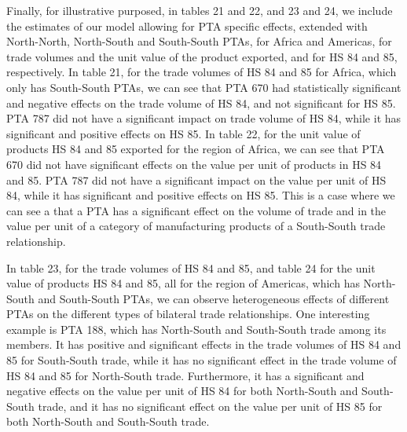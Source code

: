 Finally, for illustrative purposed, in tables 21 and 22, and 23 and 24,
we include the estimates of our model allowing for PTA specific effects,
extended with North-North, North-South and South-South PTAs, for Africa
and Americas, for trade volumes and the unit value of the product
exported, and for HS 84 and 85, respectively. In table 21, for the trade
volumes of HS 84 and 85 for Africa, which only has South-South PTAs, we
can see that PTA 670 had statistically significant and negative effects
on the trade volume of HS 84, and not significant for HS 85. PTA 787 did
not have a significant impact on trade volume of HS 84, while it has
significant and positive effects on HS 85. In table 22, for the unit
value of products HS 84 and 85 exported for the region of Africa, we can
see that PTA 670 did not have significant effects on the value per unit
of products in HS 84 and 85. PTA 787 did not have a significant impact
on the value per unit of HS 84, while it has significant and positive
effects on HS 85. This is a case where we can see a that a PTA has a
significant effect on the volume of trade and in the value per unit of a
category of manufacturing products of a South-South trade relationship.

In table 23, for the trade volumes of HS 84 and 85, and table 24 for the
unit value of products HS 84 and 85, all for the region of Americas,
which has North-South and South-South PTAs, we can observe heterogeneous
effects of different PTAs on the different types of bilateral trade
relationships. One interesting example is PTA 188, which has North-South
and South-South trade among its members. It has positive and significant
effects in the trade volumes of HS 84 and 85 for South-South trade,
while it has no significant effect in the trade volume of HS 84 and 85
for North-South trade. Furthermore, it has a significant and negative
effects on the value per unit of HS 84 for both North-South and
South-South trade, and it has no significant effect on the value per
unit of HS 85 for both North-South and South-South trade.
